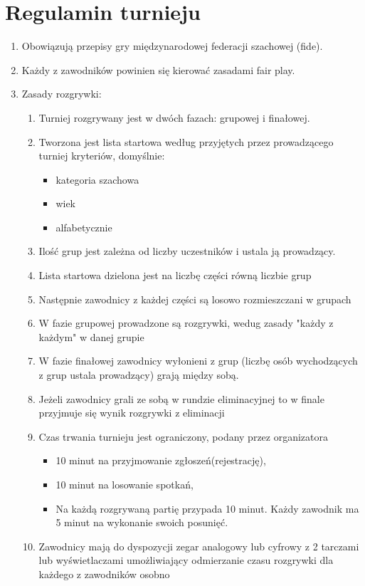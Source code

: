 \section{Regulamin turnieju}
\begin{enumerate}
\item Obowiązują przepisy gry międzynarodowej federacji szachowej (fide).
\item Każdy z zawodników powinien się kierować zasadami fair play.
\item Zasady rozgrywki:
\begin{enumerate}
\item Turniej rozgrywany jest w dwóch fazach: grupowej i finałowej.\\
\item Tworzona jest lista startowa według przyjętych przez prowadzącego turniej kryteriów, domyślnie:
\begin{itemize}
\item kategoria szachowa 
\item wiek
\item alfabetycznie
\end{itemize}
\item Ilość grup jest zależna od liczby uczestników i ustala ją prowadzący.
\item Lista startowa dzielona jest na liczbę części równą liczbie grup
\item Następnie zawodnicy z każdej części są losowo rozmieszczani w grupach
\item W fazie grupowej prowadzone są rozgrywki, wedug zasady "każdy z każdym" w danej grupie
\item W fazie finałowej zawodnicy wyłonieni z grup (liczbę osób wychodzących z grup ustala prowadzący) grają między sobą.
\item Jeżeli zawodnicy grali ze sobą w rundzie eliminacyjnej to w finale przyjmuje się wynik rozgrywki z eliminacji
\item Czas trwania turnieju jest ograniczony, podany przez organizatora
\begin{itemize}
\item 10 minut na przyjmowanie zgłoszeń(rejestrację),
\item 10 minut na losowanie spotkań,
\item Na każdą rozgrywaną partię przypada 10 minut. Każdy zawodnik ma 5 minut na wykonanie swoich posunięć.
\end{itemize}
\item Zawodnicy mają do dyspozycji zegar analogowy lub cyfrowy z 2 tarczami lub wyświetlaczami umożliwiający odmierzanie czasu rozgrywki dla każdego z zawodników osobno

\end{enumerate}
\end{enumerate}
